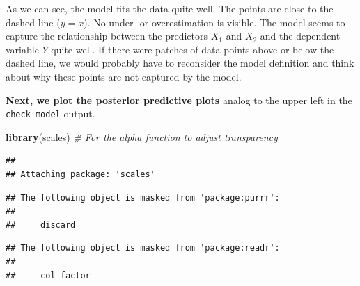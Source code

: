 \documentclass[
]{book}
\newenvironment{Shaded}{\begin{snugshade}}{\end{snugshade}}
\newcommand{\CommentTok}[1]{\textcolor[rgb]{0.56,0.35,0.01}{\textit{#1}}}
\newcommand{\FunctionTok}[1]{\textcolor[rgb]{0.13,0.29,0.53}{\textbf{#1}}}
\newcommand{\NormalTok}[1]{#1}
\begin{document}
As we can see, the model fits the data quite well. The points are close to the dashed line (\(y=x\)).
No under- or overestimation is visible. The model seems to capture the relationship between the predictors \(X_1\) and \(X_2\)
and the dependent variable \(Y\) quite well. If there were patches of data points above or below the dashed line,
we would probably have to reconsider the model definition and think about why these points are not captured by the model.

\textbf{Next, we plot the posterior predictive plots} analog to the upper left in the \texttt{check\_model} output.

\begin{Shaded}
\begin{Highlighting}[]
\FunctionTok{library}\NormalTok{(scales)  }\CommentTok{\# For the alpha function to adjust transparency}
\end{Highlighting}
\end{Shaded}

\begin{verbatim}
## 
## Attaching package: 'scales'
\end{verbatim}

\begin{verbatim}
## The following object is masked from 'package:purrr':
## 
##     discard
\end{verbatim}

\begin{verbatim}
## The following object is masked from 'package:readr':
## 
##     col_factor
\end{verbatim}
\end{document}
